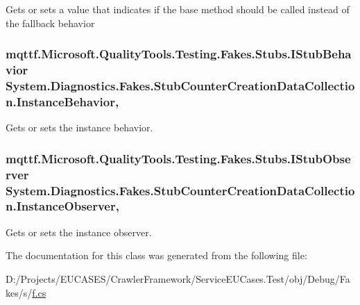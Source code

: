 Gets or sets a value that indicates if the base method should be called instead of the fallback behavior

\hypertarget{class_system_1_1_diagnostics_1_1_fakes_1_1_stub_counter_creation_data_collection_a67d7d4c84306504f2bc29efebf17c3e1}{
\subsubsection[{Instance\-Behavior}]{\setlength{\rightskip}{0pt plus 5cm}mqttf.\-Microsoft.\-Quality\-Tools.\-Testing.\-Fakes.\-Stubs.\-I\-Stub\-Behavior System.\-Diagnostics.\-Fakes.\-Stub\-Counter\-Creation\-Data\-Collection.\-Instance\-Behavior\hspace{0.3cm}{\ttfamily [get]}, {\ttfamily [set]}}}\label{class_system_1_1_diagnostics_1_1_fakes_1_1_stub_counter_creation_data_collection_a67d7d4c84306504f2bc29efebf17c3e1}


Gets or sets the instance behavior.

\hypertarget{class_system_1_1_diagnostics_1_1_fakes_1_1_stub_counter_creation_data_collection_ad8cc7d27512b90eed57599b2dfde665e}{
\subsubsection[{Instance\-Observer}]{\setlength{\rightskip}{0pt plus 5cm}mqttf.\-Microsoft.\-Quality\-Tools.\-Testing.\-Fakes.\-Stubs.\-I\-Stub\-Observer System.\-Diagnostics.\-Fakes.\-Stub\-Counter\-Creation\-Data\-Collection.\-Instance\-Observer\hspace{0.3cm}{\ttfamily [get]}, {\ttfamily [set]}}}\label{class_system_1_1_diagnostics_1_1_fakes_1_1_stub_counter_creation_data_collection_ad8cc7d27512b90eed57599b2dfde665e}


Gets or sets the instance observer.



The documentation for this class was generated from the following file\-:\begin{DoxyCompactItemize}
\item 
D\-:/\-Projects/\-E\-U\-C\-A\-S\-E\-S/\-Crawler\-Framework/\-Service\-E\-U\-Cases.\-Test/obj/\-Debug/\-Fakes/s/\hyperlink{s_2f_8cs}{f.\-cs}\end{DoxyCompactItemize}
